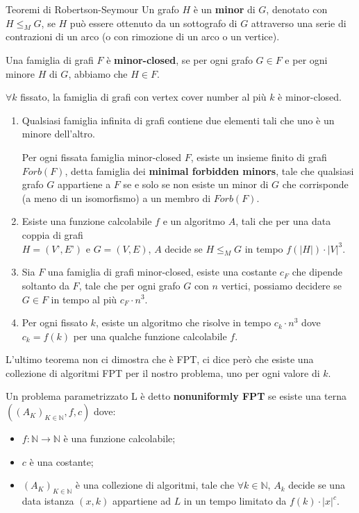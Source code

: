 \documentclass[10pt,a4paper]{article}
\begin{document}
\begin{multicols}{3}
\begin{textbox}{Teoremi di Robertson-Seymour}
Un grafo \(H\) è un \textbf{minor} di \(G\), denotato con \(H \leq_M G\), se \(H\)
può essere ottenuto da un sottografo di \(G\) attraverso una serie di
contrazioni di un arco (o con rimozione di un arco o un vertice).

Una famiglia di grafi \(F\) è \textbf{minor-closed}, se per ogni grafo \(G \in F\) e
per ogni minore \(H\) di \(G\), abbiamo che \(H \in F\).

\(\forall k\) fissato, la famiglia di grafi con vertex cover
number al più \(k\) è minor-closed.

\begin{enumerate}[leftmargin=*]
    \item Qualsiasi famiglia infinita di grafi contiene due elementi tali che uno è un minore dell’altro.
    
    Per ogni fissata famiglia minor-closed \(F\), esiste un insieme finito di grafi \(Forb(F)\), detta famiglia dei \textbf{minimal forbidden minors}, tale che qualsiasi grafo \(G\) appartiene a \(F\) se e solo se non esiste un minor di \(G\) che corrisponde (a meno di un isomorfismo) a un membro di \(Forb(F)\).
    \item Esiste una funzione calcolabile \(f\) e un algoritmo \(A\), tali che per una data coppia di grafi\\\(H=(V’,E’)\) e \(G=(V,E)\), \(A\) decide se \(H \leq_M G\) in tempo \(f(|H|)\cdot |V|^3\).
    \item Sia \(F\) una famiglia di grafi minor-closed, esiste una costante \(c_F\) che dipende soltanto da \(F\), tale che per ogni grafo \(G\) con \(n\) vertici, possiamo decidere se \(G\in F\) in tempo al più \(c_F\cdot n^3\).
    \item Per ogni fissato \(k\), esiste un algoritmo che risolve  in tempo \(c_k\cdot n^3\) dove \(c_k=f(k)\) per una qualche funzione calcolabile \(f\).
\end{enumerate}
L'ultimo teorema non ci dimostra che  è FPT, 
ci dice però che esiste una collezione di algoritmi FPT per
il nostro problema, uno per ogni valore di \(k\).

Un problema parametrizzato L è detto \textbf{nonuniformly FPT}
se esiste una terna \(((A_K)_{K\in \mathbb{N}},f,c)\) dove:
\begin{itemize}[leftmargin=*]
    \item \(f:\mathbb{N} \rightarrow \mathbb{N}\) è una funzione calcolabile;
    \item \(c\) è una costante;
    \item \((A_K)_{K\in \mathbb{N}}\) è una collezione di algoritmi, tale che
    \(\forall k \in \mathbb{N}\), \(A_k\) decide se una data istanza \((x,k)\)
    appartiene ad \(L\) in un tempo limitato da \(f(k)\cdot |x|^c\).
\end{itemize}
\end{textbox}


\end{multicols}
\end{document}
